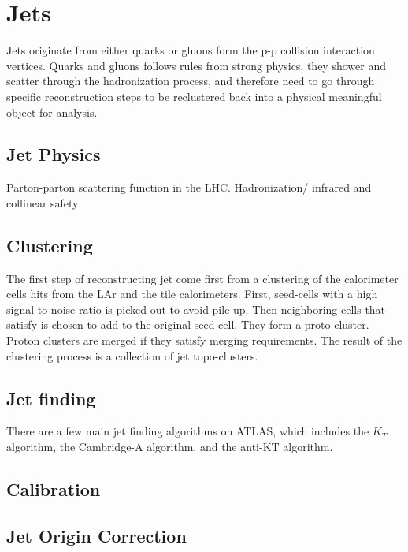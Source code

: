 %
%
%
%
%
%

\section{Jets}
Jets originate from either quarks or gluons form the p-p collision interaction vertices. Quarks and gluons follows rules from strong physics, they shower and scatter through the hadronization process, and therefore need to go through specific reconstruction steps to be reclustered back into a physical meaningful object for analysis. 

\subsection{Jet Physics}
Parton-parton scattering function in the LHC. 
Hadronization/ infrared and collinear safety

\subsection{Clustering}
The first step of reconstructing jet come first from a clustering of the calorimeter cells hits from the LAr and the tile calorimeters. First, seed-cells with a high signal-to-noise ratio is picked out to avoid pile-up. Then neighboring cells that satisfy  is chosen to add to the original seed cell. They form a proto-cluster. Proton clusters are merged if they satisfy merging requirements. The result of the clustering process is a collection of jet topo-clusters. 

\subsection{Jet finding}
There are a few main jet finding algorithms on ATLAS, which includes the $K_{T}$ algorithm, the Cambridge-A algorithm, and the anti-KT algorithm. 
\subsection{Calibration}
\subsection{Jet Origin Correction}


